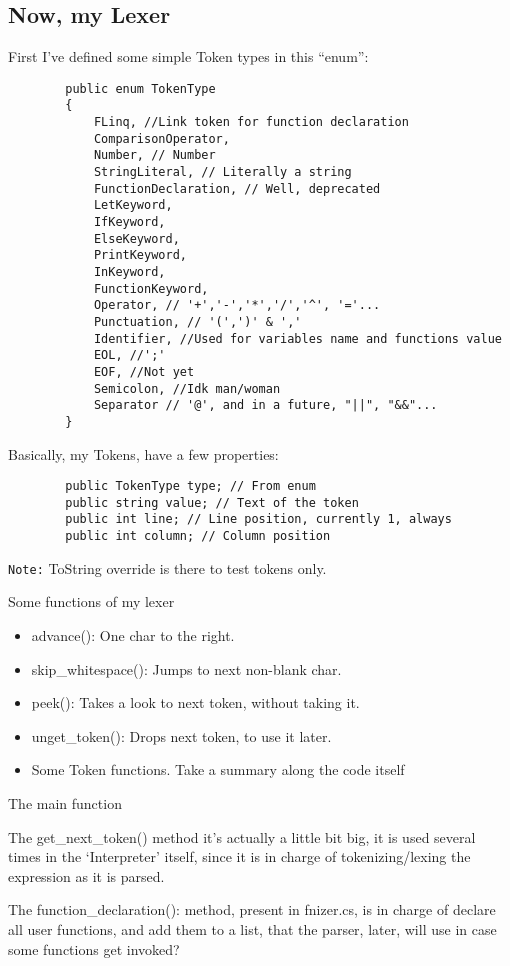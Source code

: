 \subsection{Now, my Lexer}
    First I've defined some simple Token types in this ``enum'':
    \begin{lstlisting}
        public enum TokenType
        {
            FLinq, //Link token for function declaration
            ComparisonOperator,
            Number, // Number
            StringLiteral, // Literally a string
            FunctionDeclaration, // Well, deprecated
            LetKeyword, 
            IfKeyword, 
            ElseKeyword, 
            PrintKeyword, 
            InKeyword,
            FunctionKeyword,
            Operator, // '+','-','*','/','^', '='...
            Punctuation, // '(',')' & ','
            Identifier, //Used for variables name and functions value
            EOL, //';'
            EOF, //Not yet
            Semicolon, //Idk man/woman
            Separator // '@', and in a future, "||", "&&"...
        }
    \end{lstlisting}
    Basically, my Tokens, have a few properties:
    \begin{lstlisting}
        public TokenType type; // From enum
        public string value; // Text of the token
        public int line; // Line position, currently 1, always
        public int column; // Column position
    \end{lstlisting}
    \texttt{Note:} ToString override is there to test tokens only.

    \newpage
    \begin{center}
        \centering
        Some functions of my lexer
    \end{center}
\begin{itemize}
    \item advance{()}: One char to the right.
    \item skip\_whitespace{()}: Jumps to next non-blank char.
    \item peek{()}: Takes a look to next token, without taking it.
    \item unget\_token{()}: Drops next token, to use it later.
    \item Some Token functions. Take a summary along the code itself
\end{itemize}

\begin{center}
    \centering
    The main function
\end{center}

The \hbox{get\_next\_token{()}} method it's actually a little bit big, it is used several times in the `Interpreter' itself, since it is in charge of tokenizing/lexing the expression as it is parsed.

The \hbox{function\_declaration{()}}: method, present in fnizer.cs, is in charge of declare all user functions, and add them to a list, that the parser, later, will use in case some functions get invoked?